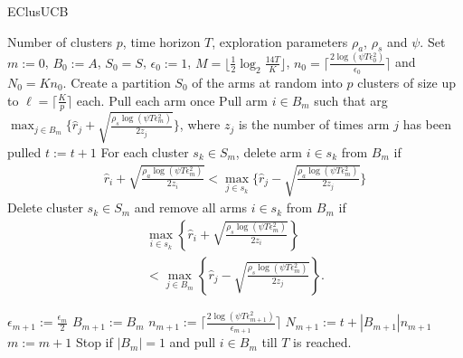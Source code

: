 \begin{algorithm}[!h]
\caption{EClusUCB}
\label{alg:eclusucb}
\begin{algorithmic}
 Number of clusters $p$, time horizon $T$, exploration parameters $\rho_a$, $\rho_s$ and $\psi$.
 Set $m:=0$, $B_{0}:=A$, $S_0 = S$, $\epsilon_{0}:=1$, $M=\big \lfloor \frac{1}{2}\log_{2} \frac{14T}{K}\big\rfloor$, $n_{0}=\bigg\lceil\frac{2\log{(\psi T\epsilon_{0}^{2})}}{\epsilon_{0}}\bigg\rceil$ and  $N_{0}=Kn_{0}$.
\State Create a partition $S_0$ of the arms at random into $p$ clusters of size up to $\ell=\bigg\lceil \frac{K}{p} \bigg\rceil$ each.
\State Pull each arm once
\State Pull arm $i\in B_m$ such that arg$\max_{j\in B_{m}}\bigg\lbrace \hat{r}_{j} + \sqrt{\frac{\rho_{s}\log{(\psi T\epsilon_{m}^{2})}}{2 z_{j}}} \bigg\rbrace$, where $z_j$ is the number of times arm $j$ has been pulled
\State $t:=t+1$
\ArmElim
\State For each cluster $s_k \in S_{m}$, delete arm ${i}\in s_{k}$ from $B_{m}$ if
\begin{align*}
\hat{r}_{i} + \sqrt{\frac{\rho_{a}\log{(\psi T\epsilon_{m}^{2})}}{2 z_{i}}}  < \max_{{j}\in s_{k}}\bigg\lbrace\hat{r}_{j} -\sqrt{\frac{\rho_{a}\log{(\psi T\epsilon_{m}^{2})}}{2 z_{j}}} \bigg\rbrace
\end{align*}
\EndArmElim
\ClusElim
\State Delete cluster $s_{k}\in S_{m}$ and remove all arms $i\in s_{k}$ from $B_{m}$ if 
\begin{align*}
 \max_{{i}\in s_{k}}\left\lbrace\hat{r}_{i} + \sqrt{\frac{\rho_{s}\log{(\psi T\epsilon_{m}^{2})}}{2 z_{i}}}\right\rbrace \\
 < \max_{{j}\in B_{m}} \left\lbrace\hat{r}_{j} - \sqrt{\frac{\rho_{s} \log{(\psi T\epsilon_{m}^{2})}}{2 z_{j}}}\right\rbrace.
\end{align*}
\EndClusElim

\State $\epsilon_{m+1}:=\frac{\epsilon_{m}}{2}$\vspace{0.5ex}
\State $B_{m+1}:=B_{m}$
\State $n_{m+1}:=\bigg\lceil\frac{2\log{(\psi T\epsilon_{m+1}^{2})}}{\epsilon_{m+1}}\bigg\rceil$
\State $N_{m+1}:=t+|B_{m+1}| n_{m+1}$
\State $m:=m+1$
\State Stop if $|B_{m}|=1$ and pull ${i}\in B_{m}$ till $T$ is reached.
\EndIf
\EndFor
\end{algorithmic}
\end{algorithm}

